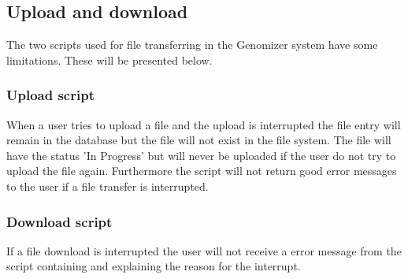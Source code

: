\subsection{Upload and download}
The two scripts used for file transferring in the Genomizer system have some limitations. These will be presented below.
\subsubsection{Upload script}
When a user tries to upload a file and the upload is interrupted the file entry will remain in the database but the file will not exist in the file system. The file will have the status 'In Progress' but will never be uploaded if the user do not try to upload the file again. Furthermore the script will not return good error messages to the user if a file transfer is interrupted. 
\subsubsection{Download script}
If a file download is interrupted the user will not receive a error message from the script containing and explaining the reason for the interrupt.